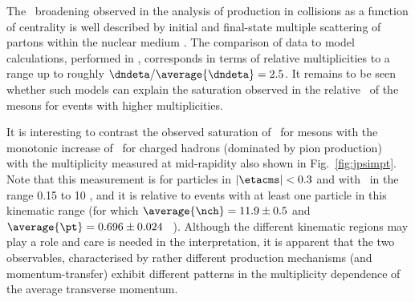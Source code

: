 The \pt ~broadening observed in the analysis of \jpsi production in \ppb collisions as a function of centrality \cite{Adam:2015jsa} is well described by initial and final-state multiple scattering of partons within the nuclear medium \cite{Kang:2013aa}. The comparison of data to model calculations, performed in \cite{Adam:2015jsa}, corresponds in terms of relative multiplicities to a range up to roughly $\dndeta/\average{\dndeta}=2.5$. It remains to be seen whether such models can explain the saturation observed in the relative \mpt ~of the \jpsi mesons for events with higher multiplicities.

It is interesting to contrast the observed saturation of \mpt~for \jpsi mesons with the monotonic increase of \mpt ~for charged hadrons (dominated by pion production) ~\cite{Abelev:2013bla} with the multiplicity measured at mid-rapidity also shown in Fig.~\ref{fig:jpsimpt}. Note that this measurement is for particles in $|\etacms|<0.3$ and with \pt ~in the range 0.15 to 10 \gevc, and it is relative to events with at least one particle in this kinematic range (for which $\average{\nch}=11.9 \pm 0.5$ and $\average{\pt}=0.696 \pm 0.024$ \gevc~\cite{Abelev:2013bla}).
Although the different kinematic regions may play a role and care is needed in the interpretation, it is apparent that the two observables, characterised by rather different production mechanisms (and momentum-transfer) exhibit different patterns in the multiplicity dependence of the average transverse momentum. 


